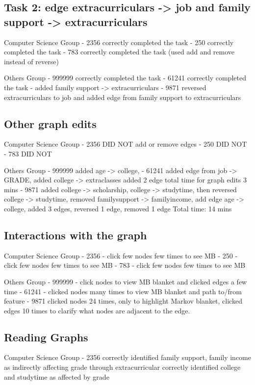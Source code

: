 \subsection{ Task 2: edge extracurriculars -> job and family support -> extracurriculars }
Computer Science Group 
- 2356 correctly completed the task
- 250 correctly completed the task
- 783 correctly completed the task (used add and remove instead of reverse)

Others Group
- 999999 correctly completed the task
- 61241 correctly completed the task - added family support -> extracurriculars 
- 9871 reversed extracurriculars to job and added edge from family support to extracurriculars

\subsection { Other graph edits }
Computer Science Group 
- 2356 DID NOT add or remove edges
- 250 DID NOT 
- 783 DID NOT

Others Group
- 999999 
    added age -> college, 
- 61241 
    added edge from job -> GRADE, added college -> extraclasses 
    added 2 edge 
    total time for graph edits 3 mins
- 9871 
    added college -> scholarship, college -> studytime, then reversed college -> studytime, removed familysupport -> familyincome, add edge age -> college, 
    added 3 edges, reversed 1 edge, removed 1 edge
    Total time: 14 mins


\subsection{ Interactions with the graph }
Computer Science Group 
- 2356 - click few nodes few times to see MB
- 250 - click few nodes few times to see MB
- 783 - click few nodes few times to see MB

Others Group
- 999999 - click nodes to view MB blanket and clicked edges a few time
- 61241 - clicked nodes many times to view MB blanket and path to/from feature
- 9871 clicked nodes 24 times, only to highlight Markov blanket, clicked edges 10 times to clarify what nodes are adjacent to the edge. 

\subsection { Reading Graphs }
Computer Science Group 
- 2356
    correctly identified family support, family income as indirectly affecting grade through extracurricular
    correctly identified college and studytime as affected by grade

